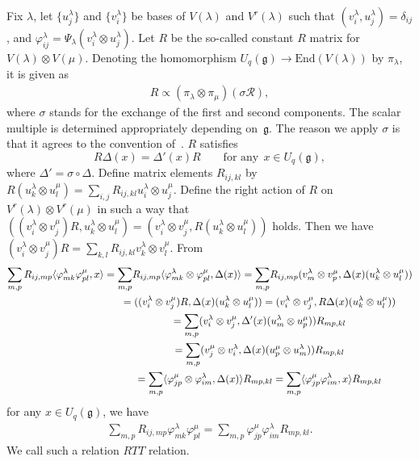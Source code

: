 \documentclass[11pt]{article}
\newcommand{\geh}{\mathfrak{g}}
\newcommand{\la}{\lambda}
\newcommand{\ot}{\otimes}
\newcommand{\pair}[1]{\langle{#1}\rangle}
\begin{document}
Fix $\la$, let $\{u^\la_j\}$ and $\{v^\la_i\}$ be bases of $V(\la)$ and $V^r(\la)$ such that
$(v^\la_i,u^\la_j)=\delta_{ij}$, and $\varphi^\la_{ij}=\Psi_\la(v^\la_i \otimes u^\la_j)$. Let $R$ be the
so-called constant $R$ matrix for $V(\la)\ot V(\mu)$. Denoting the homomorphism $U_q(\geh)\rightarrow
\mathrm{End}(V(\la))$ by $\pi_\la$, it is given as
\begin{gather}\label{eq:constR}
R\propto(\pi_\la\ot\pi_\mu)(\sigma\mathcal{R}),
\end{gather}
where $\sigma$ stands for the exchange of the f\/irst and second components.
The scalar multiple is determined appropriately depending on~$\geh$. The reason we apply $\sigma$
is that it agrees to the convention of~\cite{RTF}. $R$ satisf\/ies
\[
R\Delta(x)=\Delta'(x)R\qquad\text{for any} \ \ x\in U_q(\geh),
\]
where $\Delta'=\sigma\circ\Delta$.
Def\/ine matrix elements $R_{ij,kl}$ by $R(u^\la_k\ot u^\mu_l)=\sum_{i,j}R_{ij,kl}u^\la_i\ot u^\mu_j$.
Def\/ine the right action of $R$ on $V^r(\la)\ot V^r(\mu)$ in such a way that
$((v^\la_i\ot v^\mu_j)R,u^\la_k\ot u^\mu_l)=(v^\la_i\ot v^\mu_j,R(u^\la_k\ot u^\mu_l))$
holds. Then we have $(v^\la_i\ot v^\mu_j)R=\sum_{k,l}R_{ij,kl}v^\la_k\ot v^\mu_l$. From
\begin{gather*}
\sum_{m,p}R_{ij,mp}\pair{\varphi^\la_{mk}\varphi^\mu_{pl},x}
 = \sum_{m,p}\! R_{ij,mp}\pair{\varphi^\la_{mk}\ot\varphi^\mu_{pl},\Delta(x)}
 =\sum_{m,p} \! R_{ij,mp}(v^\la_m\ot v^\mu_p,\Delta(x)(u^\la_k\ot u^\mu_l))\\
 \hphantom{\sum_{m,p}R_{ij,mp}\pair{\varphi^\la_{mk}\varphi^\mu_{pl},x}}{}
 =((v^\la_i\ot v^\mu_j)R,\Delta(x)(u^\la_k\ot u^\mu_l))
 =(v^\la_i\ot v^\mu_j,R\Delta(x)(u^\la_k\ot u^\mu_l))\\
 \hphantom{\sum_{m,p}R_{ij,mp}\pair{\varphi^\la_{mk}\varphi^\mu_{pl},x}}{}
 =\sum_{m,p}(v^\la_i\ot v^\mu_j,\Delta'(x)(u^\la_m\ot u^\mu_p))R_{mp,kl}\\
\hphantom{\sum_{m,p}R_{ij,mp}\pair{\varphi^\la_{mk}\varphi^\mu_{pl},x}}{}
 =\sum_{m,p}(v^\mu_j\ot v^\la_i,\Delta(x)(u^\mu_p\ot u^\la_m))R_{mp,kl}\\
 \hphantom{\sum_{m,p}R_{ij,mp}\pair{\varphi^\la_{mk}\varphi^\mu_{pl},x}}{}
 =\sum_{m,p}\pair{\varphi^\mu_{jp}\ot\varphi^\la_{im},\Delta(x)}R_{mp,kl}
=\sum_{m,p}\pair{\varphi^\mu_{jp}\varphi^\la_{im},x}R_{mp,kl}
\end{gather*}
for any $x \in U_q(\geh)$, we have
\begin{gather}\label{eq:RTT}
\sum_{m,p}R_{ij,mp}\varphi^\la_{mk}\varphi^\mu_{pl}=\sum_{m,p}\varphi^\mu_{jp}\varphi^\la_{im}R_{mp,kl}.
\end{gather}
We call such a relation $RTT$ relation.
\end{document}
